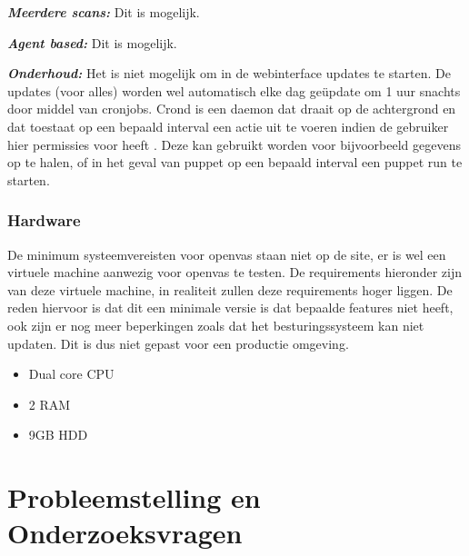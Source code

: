 \textbf{\textit{Meerdere scans: }} Dit is mogelijk.

\textbf{\textit{Agent based: }} Dit is mogelijk.

\textbf{\textit{Onderhoud: }} Het is niet mogelijk om in de webinterface updates te starten. De updates (voor alles) worden wel automatisch elke dag geüpdate om 1 uur snachts door middel van cronjobs. Crond is een daemon dat draait op de achtergrond en dat toestaat op een bepaald interval een actie uit te voeren indien de gebruiker hier permissies voor heeft \textcite{adminschoice}. Deze kan gebruikt worden voor bijvoorbeeld gegevens op te halen, of in het geval van puppet op een bepaald interval een puppet run te starten.

\subsubsection{Hardware}
De minimum systeemvereisten voor openvas staan niet op de site, er is wel een virtuele machine aanwezig voor openvas te testen. De requirements hieronder zijn van deze virtuele machine, in realiteit zullen deze requirements hoger liggen. De reden hiervoor is dat dit een minimale versie is dat bepaalde features niet heeft, ook zijn er nog meer beperkingen zoals dat het besturingssysteem kan niet updaten. Dit is dus niet gepast voor een productie omgeving.

\begin{itemize}
\item Dual core CPU
\item 2 RAM
\item 9GB HDD
\end{itemize}

\textcite{Openvas-requirements}


\section{Probleemstelling en Onderzoeksvragen}
\label{sec:onderzoeksvragen}



